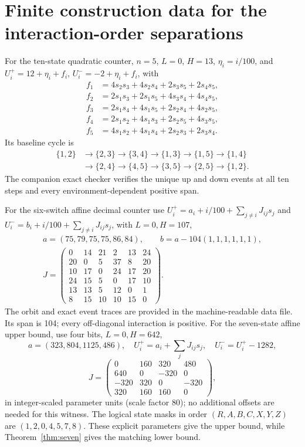 \documentclass[12pt,letterpaper]{article}
\theoremstyle{definition}\newtheorem{definition}[theorem]{Definition}
\theoremstyle{remark}\newtheorem{remark}[theorem]{Remark}
\begin{document}
\section{Finite construction data for the interaction-order separations}\label{app:designs}
For the ten-state quadratic counter, $n=5$, $L=0$, $H=13$, $\eta_i=i/100$, and $U_i^+=12+\eta_i+f_i$, $U_i^-=-2+\eta_i+f_i$, with
\begin{align*}
 f_1&=4s_2s_3+4s_2s_4+2s_3s_5+2s_4s_5,\\
 f_2&=2s_1s_3+2s_1s_5+4s_3s_4+4s_4s_5,\\
 f_3&=2s_1s_4+4s_1s_5+2s_2s_4+4s_2s_5,\\
 f_4&=2s_1s_2+4s_1s_3+2s_2s_5+4s_3s_5,\\
 f_5&=4s_1s_2+4s_1s_4+2s_2s_3+2s_3s_4.
\end{align*}
Its baseline cycle is
\[
\begin{aligned}
 \{1,2\}&\to\{2,3\}\to\{3,4\}\to\{1,3\}\to\{1,5\}\to\{1,4\}\\
 &\to\{2,4\}\to\{4,5\}\to\{3,5\}\to\{2,5\}\to\{1,2\}.
\end{aligned}
\]
The companion exact checker verifies the unique up and down events at all ten steps and every environment-dependent positive span.

For the six-switch affine decimal counter use $U_i^+=a_i+i/100+\sum_{j\ne i}J_{ij}s_j$ and $U_i^-=b_i+i/100+\sum_{j\ne i}J_{ij}s_j$, with $L=0,H=107$,
\begin{gather*}
 a=(75,79,75,75,86,84),\qquad b=a-104(1,1,1,1,1,1),\\
 J=\begin{pmatrix}
0&14&21&2&13&24\\20&0&5&37&8&20\\10&17&0&24&17&20\\24&15&5&0&17&10\\13&13&5&12&0&1\\8&15&10&10&15&0
\end{pmatrix}.
\end{gather*}
The orbit and exact event traces are provided in the machine-readable data file. Its span is 104; every off-diagonal interaction is positive. For the seven-state affine upper bound, use four bits, $L=0,H=642$,
\[
 a=(323,804,1125,486),\quad U_i^+=a_i+\sum_jJ_{ij}s_j,\quad U_i^-=U_i^+-1282,
\]
\[
 J=\begin{pmatrix}0&160&320&480\\640&0&-320&0\\-320&320&0&-320\\320&160&160&0\end{pmatrix},
\]
in integer-scaled parameter units (scale factor 80); no additional offsets are needed for this witness. The logical state masks in order $(R,A,B,C,X,Y,Z)$ are $(1,2,0,4,5,7,8)$. These explicit parameters give the upper bound, while Theorem~\ref{thm:seven} gives the matching lower bound.
\end{document}
